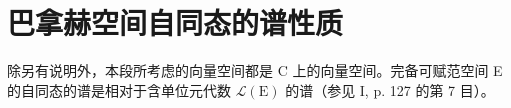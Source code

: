 \section{巴拿赫空间自同态的谱性质}

除另有说明外，本段所考虑的向量空间都是 C 上的向量空间。完备可赋范空间 E 的自同态的谱是相对于含单位元代数 \(\mathcal{L}(\mathrm{E})\) 的谱（参见 I, p. 127 的第 7 目）。

